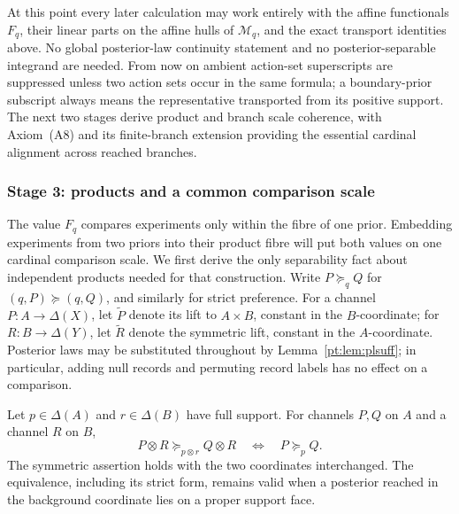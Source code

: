 At this point every later calculation may work entirely with the affine
functionals $F_q$, their linear parts on the affine hulls of
$\mathcal M_q$, and the exact transport identities above.  No global
posterior-law continuity statement and no posterior-separable integrand are
needed.  From now on ambient action-set superscripts are suppressed unless
two action sets occur in the same formula; a boundary-prior subscript always
means the representative transported from its positive support.  The next two
stages derive product and branch scale coherence, with Axiom~\textup{(A8)} and its finite-branch extension providing
the essential cardinal alignment across reached
branches.

\subsubsection{Stage 3: products and a common comparison scale}

The value $F_q$ compares experiments only within the fibre of one prior.
Embedding experiments from two priors into their product fibre will put both
values on one cardinal comparison scale.  We first derive the only
separability fact about independent products needed for that construction.
Write $P\succeq_qQ$ for $(q,P)\succeq(q,Q)$, and similarly for strict
preference.  For a channel $P:A\to\Delta(X)$, let $\widetilde P$ denote its
lift to $A\times B$, constant in the $B$-coordinate; for
$R:B\to\Delta(Y)$, let $\widetilde R$ denote the symmetric lift, constant in
the $A$-coordinate.
Posterior laws may be substituted throughout by Lemma~\ref{pt:lem:plsuff};
in particular, adding null records and permuting record labels has no effect
on a comparison.

\begin{lemma}
\label{pt:lem:background}
Let $p\in\Delta(A)$ and $r\in\Delta(B)$ have full support.  For channels
$P,Q$ on $A$ and a channel $R$ on $B$,
\begin{equation}
 P\otimes R\succeq_{p\otimes r}Q\otimes R
 \quad\Longleftrightarrow\quad
 P\succeq_p Q .
\tag{BI}\label{pt:eq:backgroundinert}
\end{equation}
The symmetric assertion holds with the two coordinates interchanged.  The
equivalence, including its strict form, remains valid when a posterior reached
in the background coordinate lies on a proper support face.
\end{lemma}

